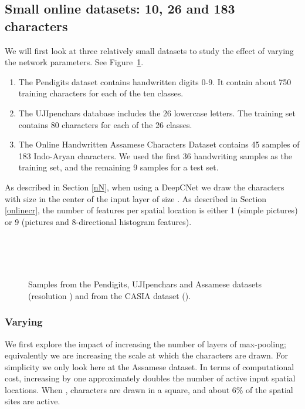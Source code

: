 \documentclass{article}
\numberwithin{equation}{subsection}
\newenvironment{circlist}{
  \begin{enumerate}[]
  \setlength{\itemsep}{0pt}
  \setlength{\parskip}{0pt}
  \setlength{\parsep}{0pt}
}{\end{enumerate}}
\begin{document}
\subsection{Small online datasets: 10, 26 and 183 characters}\label{small-datasets}
We will first look at three relatively small datasets \cite{UCIrep} to study the effect of varying the network parameters. See Figure~\ref{datasets}.
\begin{circlist}
\item The Pendigits dataset contains handwritten digits 0-9. It contain about 750 training characters for each of the ten classes.
\item The UJIpenchars database includes the 26 lowercase letters. The training set contains 80 characters for each of the 26 classes.
\item The Online Handwritten Assamese Characters Dataset contains 45 samples of 183 Indo-Aryan characters. We used the first 36 handwriting samples as the training set, and the remaining 9 samples for a test set.
\end{circlist}
As described in Section \ref{nN}, when using a DeepCNet we draw the characters with size  in the center of the input layer of size .
As described in Section \ref{onlinecr}, the number of features  per spatial location is either 1 (simple pictures) or 9 (pictures and 8-directional histogram features).


\begin{figure}
\\

\\

\\

\caption{Samples from the Pendigits, UJIpenchars and Assamese datasets (resolution ) and from the CASIA dataset ().\label{datasets}}
\end{figure}

\subsubsection{Varying }\label{varyl}
We first explore the impact of increasing the number  of layers of max-pooling; equivalently we are increasing the scale  at which the characters are drawn. For simplicity we only look here at the Assamese dataset. In terms of computational cost, increasing  by one approximately doubles the number of active input spatial locations. When , characters are drawn in a  square, and about 6\% of the spatial sites are active.
\end{document}
